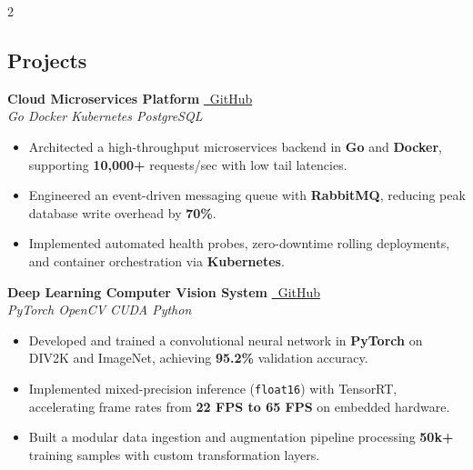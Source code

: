 \documentclass[10pt, a4paper]{article}
\newcommand{\entry}[4]{%
  \vspace{2pt}
  {\bfseries\color{bodytext} #1}\hfill{\small\color{lightgray} #3}\\
  {\small\itshape\color{accent} #2}\hfill{\small\color{lightgray} #4}
  \vspace{2pt}
}
\newenvironment{bullets}{%
  \begin{itemize}[leftmargin=1.1em, itemsep=1pt, topsep=2pt, parsep=0pt]
  \small\color{bodytext}
}{\end{itemize}}
\begin{document}
\begin{paracol}{2}
\begin{rightcolumn}
\hspace{10pt}\begin{minipage}[t]{\dimexpr\linewidth-20pt}
\vspace{16pt}

\section{Projects}

\entry{Cloud Microservices Platform}%
      {Go \textbullet{} Docker \textbullet{} Kubernetes \textbullet{} PostgreSQL}%
      {\href{https://github.com/yourusername/project1}{\faIcon{github}~GitHub}}%
      {}
\begin{bullets}
  \item Architected a high-throughput microservices backend in \textbf{Go} and \textbf{Docker}, supporting \textbf{10,000+} requests/sec with low tail latencies.
  \item Engineered an event-driven messaging queue with \textbf{RabbitMQ}, reducing peak database write overhead by \textbf{70\%}.
  \item Implemented automated health probes, zero-downtime rolling deployments, and container orchestration via \textbf{Kubernetes}.
\end{bullets}

\vspace{4pt}

\entry{Deep Learning Computer Vision System}%
      {PyTorch \textbullet{} OpenCV \textbullet{} CUDA \textbullet{} Python}%
      {\href{https://github.com/yourusername/project2}{\faIcon{github}~GitHub}}%
      {}
\begin{bullets}
  \item Developed and trained a convolutional neural network in \textbf{PyTorch} on DIV2K and ImageNet, achieving \textbf{95.2\%} validation accuracy.
  \item Implemented mixed-precision inference (\texttt{float16}) with TensorRT, accelerating frame rates from \textbf{22 FPS to 65 FPS} on embedded hardware.
  \item Built a modular data ingestion and augmentation pipeline processing \textbf{50k+} training samples with custom transformation layers.
\end{bullets}

\vspace{4pt}


\end{minipage}
\end{rightcolumn}
\end{paracol}
\end{document}
